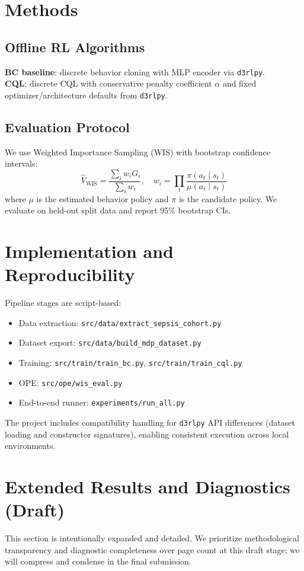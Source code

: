 \documentclass[10pt]{article}
\begin{document}
\section{Methods}
\subsection{Offline RL Algorithms}
\textbf{BC baseline}: discrete behavior cloning with MLP encoder via \texttt{d3rlpy}.\\
\textbf{CQL}: discrete CQL with conservative penalty coefficient $\alpha$ and fixed optimizer/architecture defaults from \texttt{d3rlpy}.

\subsection{Evaluation Protocol}
We use Weighted Importance Sampling (WIS) with bootstrap confidence intervals:
\[
\hat{V}_{\mathrm{WIS}} = \frac{\sum_i w_i G_i}{\sum_i w_i}, \quad w_i = \prod_t \frac{\pi(a_t\mid s_t)}{\mu(a_t\mid s_t)}
\]
where $\mu$ is the estimated behavior policy and $\pi$ is the candidate policy. We evaluate on held-out split data and report 95\% bootstrap CIs.

\section{Implementation and Reproducibility}
Pipeline stages are script-based:
\begin{itemize}[leftmargin=*]
  \item Data extraction: \texttt{src/data/extract\_sepsis\_cohort.py}
  \item Dataset export: \texttt{src/data/build\_mdp\_dataset.py}
  \item Training: \texttt{src/train/train\_bc.py}, \texttt{src/train/train\_cql.py}
  \item OPE: \texttt{src/ope/wis\_eval.py}
  \item End-to-end runner: \texttt{experiments/run\_all.py}
\end{itemize}

The project includes compatibility handling for \texttt{d3rlpy} API differences (dataset loading and constructor signatures), enabling consistent execution across local environments.

\section{Extended Results and Diagnostics (Draft)}
This section is intentionally expanded and detailed. We prioritize methodological transparency and diagnostic completeness over page count at this draft stage; we will compress and condense in the final submission.
\end{document}
